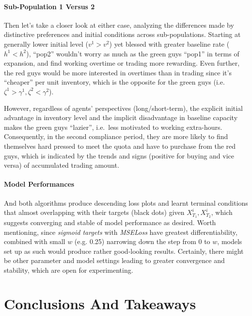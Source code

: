 \documentclass[a4paper,10pt]{article}
\newcommand{\1}{\mathbf{1}}
\begin{document}
\paragraph{Sub-Population 1 Versus 2}

Then let's take a closer look at either case, analyzing the differences
made by distinctive preferences and initial conditions across
sub-populations. Starting at generally lower initial level (\(v^1>v^2\))
yet blessed with greater baseline rate (\(h^1<h^2\)), ``pop2'' wouldn't
worry as much as the green guys ``pop1'' in terms of expansion, and find
working overtime or trading more rewarding. Even further, the red guys
would be more interested in overtimes than in trading since it's
``cheaper'' per unit inventory, which is the opposite for the green guys
(i.e.~\(\zeta^1>\gamma^1, \zeta^2<\gamma^2\)).

However, regardless of agents' perspectives (long/short-term), the
explicit initial advantage in inventory level and the implicit
disadvantage in baseline capacity makes the green guys ``lazier'',
i.e.~less motivated to working extra-hours. Consequently, in the second
compliance period, they are more likely to find themselves hard pressed
to meet the quota and have to purchase from the red guys, which is
indicated by the trends and signs (positive for buying and vice versa)
of accumulated trading amount.

\paragraph{Model Performances}

And both algorithms produce descending loss plots and learnt terminal
conditions that almost overlapping with their targets (black dots) given
\(X_{T_1}^i, X_{T_2}^i\), which suggests converging and stable
of model performance as desired. Worth mentioning, since \textit{sigmoid targets} with \textit{MSELoss} have greatest differentiability, combined with small \(w\) (e.g. 0.25) narrowing down the step from 0 to \(w\), models set up as such would produce rather good-looking results. Certainly, there might be other parameter and model settings leading to greater
convergence and stability, which are open for experimenting.

\section{Conclusions And Takeaways}
\end{document}
